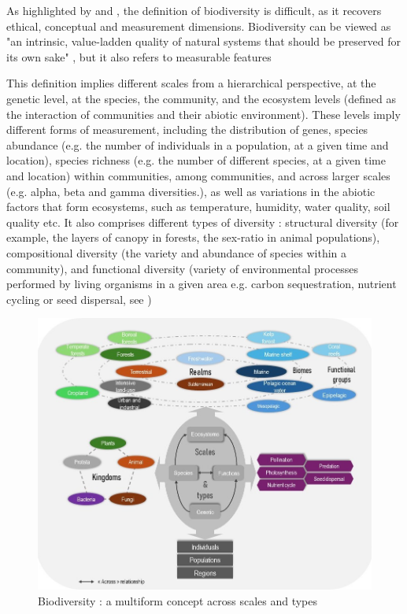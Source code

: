 As highlighted by \cite{mouysset_diversity_2023} and \cite{VanDyke2008}, the definition of biodiversity is difficult, as it recovers ethical, conceptual and measurement dimensions. Biodiversity can be viewed as "an intrinsic, value-ladden quality of natural systems that should be preserved for its own sake" \citep{VanDyke2008, mouysset_diversity_2023}, but it also refers to measurable features

This definition implies different scales from a hierarchical perspective, at the genetic level, at the species, the community, and the ecosystem levels (defined as the interaction of communities and their abiotic environment). These levels imply different forms of measurement, including the distribution of genes, species abundance (e.g. the number of individuals in a population, at a given time and location), species richness (e.g. the number of different species, at a given time and location) within communities, among communities, and across larger scales (e.g. alpha, beta and gamma diversities.), as well as variations in the abiotic factors that form ecosystems, such as temperature, humidity, water quality, soil quality etc. 
It also comprises different types of diversity : structural diversity (for example, the layers of canopy in forests, the sex-ratio in animal populations), compositional diversity (the variety and abundance of species within a community), and functional diversity (variety of environmental processes performed by living organisms in a given area e.g. carbon sequestration, nutrient cycling or seed dispersal, see \cite{loreau_biodiversity_2002})

\begin{figure}
	\centering
	\includegraphics[width =.8\textwidth]{figures/intro/biodiv_illustration.jpg}
	\caption{Biodiversity : a multiform concept across scales and types}
	\label{fig:intro_biod}
\end{figure}

